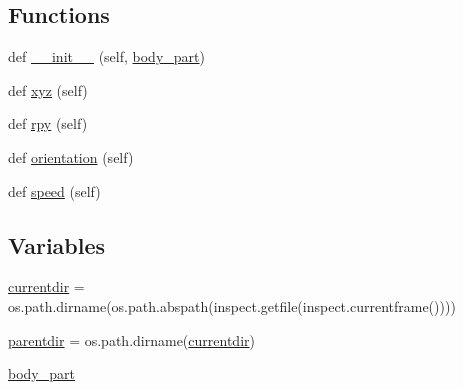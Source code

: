 \subsection*{Functions}
\begin{DoxyCompactItemize}
\item 
def \hyperlink{namespacepybullet-gym_1_1pybulletgym_1_1envs_1_1mujoco_1_1robots_1_1robot__bases_a2c4205c8cdf4f60217c1b5431faed90e}{\+\_\+\+\_\+init\+\_\+\+\_\+} (self, \hyperlink{namespacepybullet-gym_1_1pybulletgym_1_1envs_1_1mujoco_1_1robots_1_1robot__bases_ada94b7dcfe5a2e2f442eab3e92e9bdc1}{body\+\_\+part})
\item 
def \hyperlink{namespacepybullet-gym_1_1pybulletgym_1_1envs_1_1mujoco_1_1robots_1_1robot__bases_a83d2aa4a8b4f8914f417440a5c4c8401}{xyz} (self)
\item 
def \hyperlink{namespacepybullet-gym_1_1pybulletgym_1_1envs_1_1mujoco_1_1robots_1_1robot__bases_aae769e0c68e45c72ec2c2c5a8a417c84}{rpy} (self)
\item 
def \hyperlink{namespacepybullet-gym_1_1pybulletgym_1_1envs_1_1mujoco_1_1robots_1_1robot__bases_a43c43149f85e8e7a4ac1b66c78f6290f}{orientation} (self)
\item 
def \hyperlink{namespacepybullet-gym_1_1pybulletgym_1_1envs_1_1mujoco_1_1robots_1_1robot__bases_adf30a8abad8b47884ddd30f877d26c55}{speed} (self)
\end{DoxyCompactItemize}
\subsection*{Variables}
\begin{DoxyCompactItemize}
\item 
\hyperlink{namespacepybullet-gym_1_1pybulletgym_1_1envs_1_1mujoco_1_1robots_1_1robot__bases_ac77a27c840c1b225f3c6ba7e03fe4800}{currentdir} = os.\+path.\+dirname(os.\+path.\+abspath(inspect.\+getfile(inspect.\+currentframe())))
\item 
\hyperlink{namespacepybullet-gym_1_1pybulletgym_1_1envs_1_1mujoco_1_1robots_1_1robot__bases_a04e2378f0d750e10d1618a4183972fe0}{parentdir} = os.\+path.\+dirname(\hyperlink{namespacepybullet-gym_1_1pybulletgym_1_1envs_1_1mujoco_1_1robots_1_1robot__bases_ac77a27c840c1b225f3c6ba7e03fe4800}{currentdir})
\item 
\hyperlink{namespacepybullet-gym_1_1pybulletgym_1_1envs_1_1mujoco_1_1robots_1_1robot__bases_ada94b7dcfe5a2e2f442eab3e92e9bdc1}{body\+\_\+part}
\end{DoxyCompactItemize}


